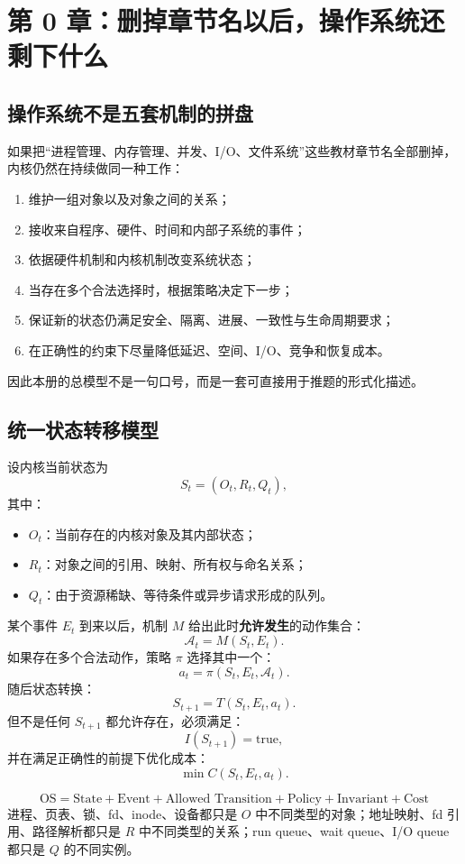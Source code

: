 \documentclass[11pt,a4paper]{ctexart}
\newcommand{\kw}[1]{\textbf{#1}}
\begin{document}
\tableofcontents
\newpage

\section{第 0 章：删掉章节名以后，操作系统还剩下什么}

\subsection{操作系统不是五套机制的拼盘}
如果把“进程管理、内存管理、并发、I/O、文件系统”这些教材章节名全部删掉，内核仍然在持续做同一种工作：
\begin{enumerate}
  \item 维护一组对象以及对象之间的关系；
  \item 接收来自程序、硬件、时间和内部子系统的事件；
  \item 依据硬件机制和内核机制改变系统状态；
  \item 当存在多个合法选择时，根据策略决定下一步；
  \item 保证新的状态仍满足安全、隔离、进展、一致性与生命周期要求；
  \item 在正确性的约束下尽量降低延迟、空间、I/O、竞争和恢复成本。
\end{enumerate}

因此本册的总模型不是一句口号，而是一套可直接用于推题的形式化描述。

\subsection{统一状态转移模型}
设内核当前状态为
\[
S_t=(O_t,R_t,Q_t),
\]
其中：
\begin{itemize}
  \item $O_t$：当前存在的内核对象及其内部状态；
  \item $R_t$：对象之间的引用、映射、所有权与命名关系；
  \item $Q_t$：由于资源稀缺、等待条件或异步请求形成的队列。
\end{itemize}

某个事件 $E_t$ 到来以后，机制 $M$ 给出此时\kw{允许发生}的动作集合：
\[
\mathcal A_t=M(S_t,E_t).
\]
如果存在多个合法动作，策略 $\pi$ 选择其中一个：
\[
a_t=\pi(S_t,E_t,\mathcal A_t).
\]
随后状态转换：
\[
\boxed{S_{t+1}=T(S_t,E_t,a_t)}.
\]
但不是任何 $S_{t+1}$ 都允许存在，必须满足：
\[
\boxed{I(S_{t+1})=\text{true}},
\]
并在满足正确性的前提下优化成本：
\[
\boxed{\min C(S_t,E_t,a_t)}.
\]

\begin{corebox}[一句话总模型]
\[
\boxed{
\text{OS}=\text{State}+\text{Event}+\text{Allowed Transition}+\text{Policy}+\text{Invariant}+\text{Cost}
}
\]
进程、页表、锁、fd、inode、设备都只是 $O$ 中不同类型的对象；地址映射、fd 引用、路径解析都只是 $R$ 中不同类型的关系；run queue、wait queue、I/O queue 都只是 $Q$ 的不同实例。
\end{corebox}
\end{document}
